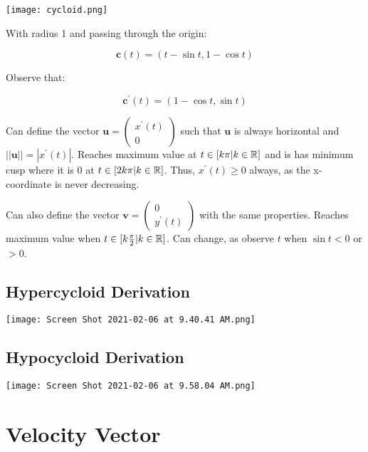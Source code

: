 \begin{center}
    \texttt{[image: cycloid.png]}
\end{center}

With radius 1 and passing through the origin:

\[\textbf{c}(t)=(t-\sin t, 1 - \cos t)\]

Observe that:

\[\textbf{c}^\prime(t)=(1-\cos t, \sin t)\]

Can define the vector $\textbf{u}=\left(\begin{array}{c}x^{\prime}(t) \\0\end{array}\right)$
such that $\textbf{u}$ is always horizontal and $||\textbf{u}||=|x^\prime(t)|$. Reaches maximum
value at $t\in[k\pi|k\in\mathbb{R}]$ and is has minimum cusp where it is 0 at $t\in [2k\pi|k\in\mathbb{R}]$.
Thus, $x^\prime(t)\geq 0$ always, as the x-coordinate is never decreasing. \newline

\noindent
Can also define the vector $\textbf{v}=\left(\begin{array}{c}0 \\y^{\prime}(t)\end{array}\right)$
with the same properties. Reaches maximum value when $t\in[k\frac{\pi}{2}|k\in\mathbb{R}]$.
Can change, as observe $t$ when $\sin t < 0$ or $ >0 $.

\subsection{Hypercycloid Derivation}

\begin{center}
    \texttt{[image: Screen Shot 2021-02-06 at 9.40.41 AM.png]}
\end{center}

\subsection{Hypocycloid Derivation}

\begin{center}
    \texttt{[image: Screen Shot 2021-02-06 at 9.58.04 AM.png]}
\end{center}

\section{Velocity Vector}

